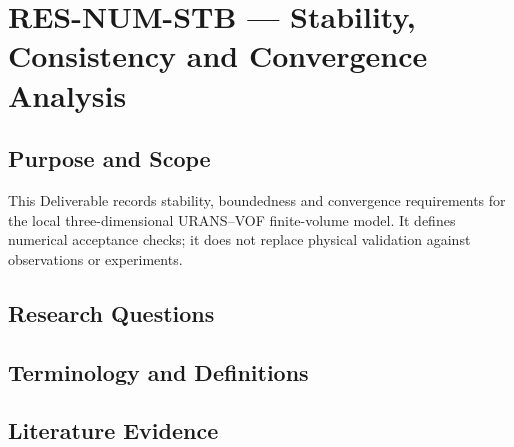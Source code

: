 
\section{RES-NUM-STB --- Stability, Consistency and Convergence Analysis}
\label{sec:res-num-stb}

\subsection{Purpose and Scope}
\label{sec:res-num-stb-purpose}


This Deliverable records stability, boundedness and convergence
requirements for the local three-dimensional URANS--VOF finite-volume
model. It defines numerical acceptance checks; it does not replace
physical validation against observations or experiments.

\subsection{Research Questions}
\label{sec:res-num-stb-research-questions}


\subsection{Terminology and Definitions}
\label{sec:res-num-stb-definitions}


\subsection{Literature Evidence}
\label{sec:res-num-stb-literature-evidence}


